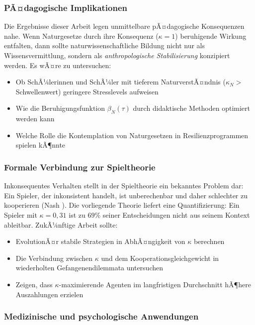 ﻿\documentclass[a4paper,12pt]{article}
\theoremstyle{definition}
\begin{document}
\subsubsection{PÃ¤dagogische Implikationen}

Die Ergebnisse dieser Arbeit legen unmittelbare pÃ¤dagogische Konsequenzen nahe. Wenn Naturgesetze durch ihre Konsequenz ($\kappa = 1$) beruhigende Wirkung entfalten, dann sollte naturwissenschaftliche Bildung nicht nur als Wissensvermittlung, sondern als \emph{anthropologische Stabilisierung} konzipiert werden. Es wÃ¤re zu untersuchen:
\begin{itemize}
\item Ob SchÃ¼lerinnen und SchÃ¼ler mit tieferem NaturverstÃ¤ndnis ($\kappa_N > $ Schwellenwert) geringere Stresslevels aufweisen
\item Wie die Beruhigungsfunktion $\beta_N(\tau)$ durch didaktische Methoden optimiert werden kann
\item Welche Rolle die Kontemplation von Naturgesetzen in Resilienzprogrammen spielen kÃ¶nnte
\end{itemize}

\subsubsection{Formale Verbindung zur Spieltheorie}

Inkonsequentes Verhalten stellt in der Spieltheorie ein bekanntes Problem dar: Ein Spieler, der inkonsistent handelt, ist unberechenbar und daher schlechter zu kooperieren (Nash \cite{nash1951}). Die vorliegende Theorie liefert eine Quantifizierung: Ein Spieler mit $\kappa = 0{,}31$ ist zu $69\%$ seiner Entscheidungen nicht aus seinem Kontext ableitbar. ZukÃ¼nftige Arbeit sollte:
\begin{itemize}
\item EvolutionÃ¤r stabile Strategien in AbhÃ¤ngigkeit von $\kappa$ berechnen
\item Die Verbindung zwischen $\kappa$ und dem Kooperationsgleichgewicht in wiederholten Gefangenendilemmata untersuchen
\item Zeigen, dass $\kappa$-maximierende Agenten im langfristigen Durchschnitt hÃ¶here Auszahlungen erzielen
\end{itemize}

\subsubsection{Medizinische und psychologische Anwendungen}
\end{document}
